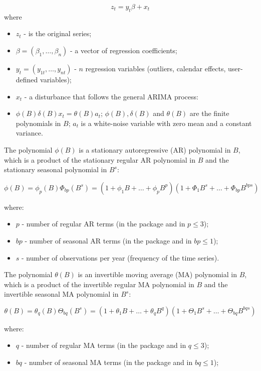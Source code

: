 \documentclass[article]{jss}
\providecommand{\tightlist}{%
  \setlength{\itemsep}{0pt}\setlength{\parskip}{0pt}}
\begin{document}
\[z_t=y_t\beta+x_t\] where

\begin{itemize}
\tightlist
\item
  \(z_t\) - is the original series;
\item
  \(\beta = (\beta_1,\dots,\beta_n)\) - a vector of regression
  coefficients;
\item
  \(y_t = (y_{1t},\dots,y_{nt})\) - \(n\) regression variables
  (outliers, calendar effects, user-defined variables);
\item
  \(x_t\) - a disturbance that follows the general ARIMA process:
\item
  \(\phi(B)\delta(B)x_t=\theta(B)a_t\); \(\phi(B), \delta(B)\) and
  \(\theta(B)\) are the finite polynomials in \(B\); \(a_t\) is a
  white-noise variable with zero mean and a constant variance.
\end{itemize}

The polynomial \(\phi(B)\) is a stationary autoregressive (AR)
polynomial in \(B\), which is a product of the stationary regular AR
polynomial in \(B\) and the stationary seasonal polynomial in \(B^s\):

\[\phi(B)=\phi_p(B)\Phi_{bp}(B^s)=(1+\phi_1B+\dots+\phi_pB^p)(1+\Phi_1B^s+\dots+\Phi_{bp}B^{bps})\]

where:

\begin{itemize}
\tightlist
\item
  \(p\) - number of regular AR terms (in the package and in
   \(p \le 3\));
\item
  \(bp\) - number of seasonal AR terms (in the package and in
   \(bp \le 1\));
\item
  \(s\) - number of observations per year (frequency of the time
  series).
\end{itemize}

The polynomial \(\theta(B)\) is an invertible moving average (MA)
polynomial in \(B\), which is a product of the invertible regular MA
polynomial in \(B\) and the invertible seasonal MA polynomial in
\(B^s\):

\[\theta(B)=\theta_q(B)\Theta_{bq}(B^s)=(1+\theta_1B+\dots+\theta_qB^q)(1+\Theta_1B^s+\dots+\Theta_{bq}B^{bqs})\]

where:

\begin{itemize}
\tightlist
\item
  \(q\) - number of regular MA terms (in the package and in
   \(q \le 3\));
\item
  \(bq\) - number of seasonal MA terms (in the package and in
   \(bq \le 1\));
\end{itemize}
\end{document}
